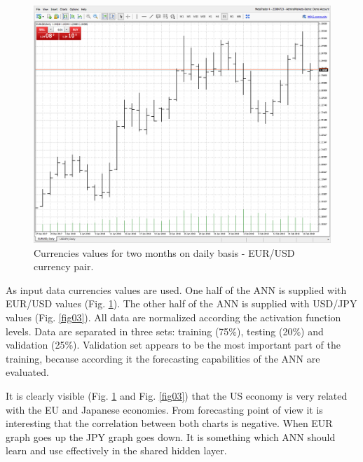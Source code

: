 \documentclass{llncs}
\begin{document}
\begin{figure}
  \includegraphics[width=1.0\linewidth]{fig02}
  \caption{Currencies values for two months on daily basis - EUR/USD currency pair.}
  \label{fig02}
\end{figure}
\FloatBarrier

As input data currencies values are used. One half of the ANN is supplied with EUR/USD values (Fig. \ref{fig02}). The other half of the ANN is supplied with USD/JPY values (Fig. \ref{fig03}). All data are normalized according the activation function levels. Data are separated in three sets: training (75\%), testing (20\%) and validation (25\%).  Validation set appears to be the most important part of the training, because according it the forecasting capabilities of the ANN are evaluated.

It is clearly visible (Fig. \ref{fig02} and Fig. \ref{fig03}) that the US economy is very related with the EU and Japanese economies. From forecasting point of view it is interesting that the correlation between both charts is negative. When EUR graph goes up the JPY graph goes down. It is something which ANN should learn and use effectively in the shared hidden layer. 
\end{document}
